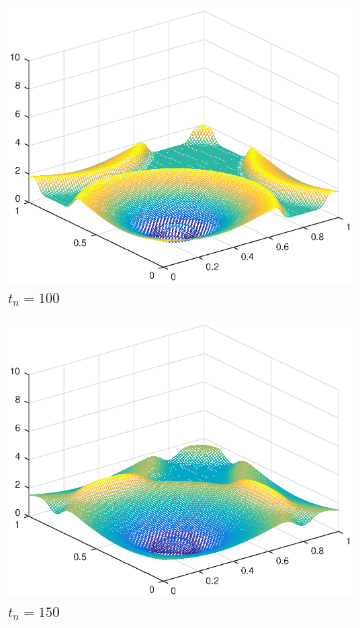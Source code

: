 \begin{figure}[h!]
    \begin{subfigure}[t]{0.48\textwidth}
        \centering
        \includegraphics[width=\textwidth]{images/sol_ri_0100_per.eps}
        \caption{$t_{n}=100$}
        \label{fig:50}
    \end{subfigure}
    \begin{subfigure}[t]{0.48\textwidth}
        \centering
        \includegraphics[width=\textwidth]{images/sol_ri_0150_per.eps}
        \caption{$t_{n}=150$}
        \label{fig:100}
    \end{subfigure}
    \begin{subfigure}[t]{0.48\textwidth}

\end{subfigure}
\end{figure}

